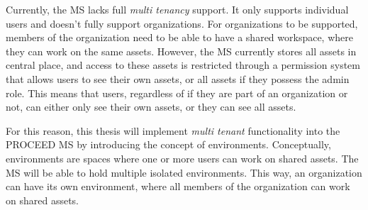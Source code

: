 
Currently, the MS lacks full \textit{multi tenancy} support.
It only supports individual users and doesn't fully support organizations.
For organizations to be supported, members of the organization need to be able to have a
shared workspace, where they can work on the same assets.
However, the MS currently stores all assets in central place,
and access to these assets is restricted through a permission system that allows users to see
their own assets, or all assets if they possess the admin role.
This means that users, regardless of if they are part of an organization or not,
can either only see their own assets,  or they can see all assets.



For this reason, this thesis will implement \textit{multi tenant} functionality into the PROCEED MS by introducing the concept of environments.
Conceptually, environments are spaces where one or more users can work on shared assets.
The MS will be able to hold multiple isolated environments.
This way, an organization can have its own environment, where all members of the
organization can work on shared assets.

